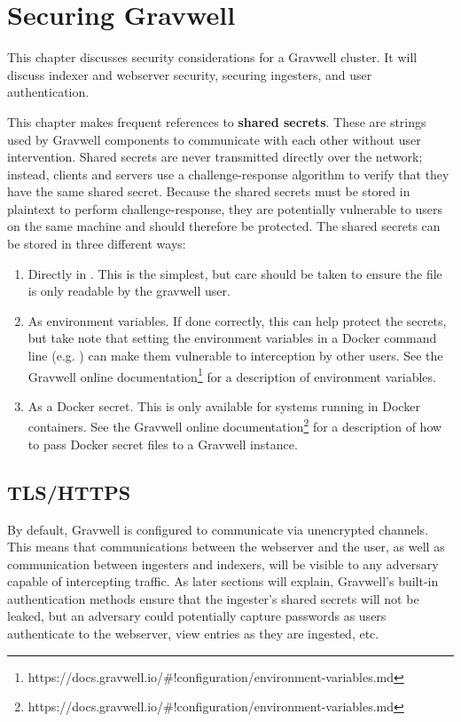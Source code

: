 \chapter{Securing Gravwell}
This chapter discusses security considerations for a Gravwell cluster.
It will discuss indexer and webserver security, securing ingesters, and
user authentication.

This chapter makes frequent references to \textbf{shared secrets}. These are
strings used by Gravwell components to communicate with each other
without user intervention. Shared secrets are never transmitted directly
over the network; instead, clients and servers use a challenge-response
algorithm to verify that they have the same shared secret. Because the
shared secrets must be stored in plaintext to perform
challenge-response, they are potentially vulnerable to users on the same
machine and should therefore be protected. The shared secrets can be
stored in three different ways:

\begin{enumerate}
\tightlist
\item
  Directly in . This is the simplest, but care should
  be taken to ensure the file is only readable by the gravwell user.
\item
  As environment variables. If done correctly, this can help protect
  the secrets, but take note that setting the environment variables in a
  Docker command line (e.g. ) can
  make them vulnerable to interception by other users. See
  the Gravwell online documentation\footnote{https://docs.gravwell.io/\#!configuration/environment-variables.md} for a description of environment variables.
\item
  As a Docker secret. This is only available for systems running in
  Docker containers. See
  the Gravwell online documentation\footnote{https://docs.gravwell.io/\#!configuration/environment-variables.md} for a description of how to pass Docker secret files to a Gravwell instance.
\end{enumerate}



\section{TLS/HTTPS}
By default, Gravwell is configured to communicate via unencrypted
channels. This means that communications between the webserver and the
user, as well as communication between ingesters and indexers, will be
visible to any adversary capable of intercepting traffic. As later
sections will explain, Gravwell's built-in authentication methods ensure
that the ingester's shared secrets will not be leaked, but an adversary
could potentially capture passwords as users authenticate to the
webserver, view entries as they are ingested, etc.

